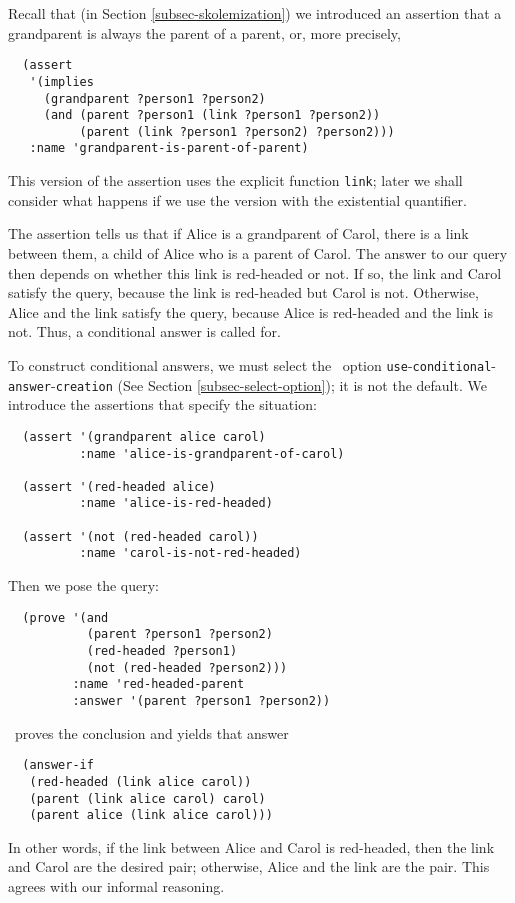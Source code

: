 Recall that (in Section \ref{subsec-skolemization}) we introduced
an assertion that a grandparent is always the parent of a parent, or,
more precisely,
\begin{verbatim}
  (assert
   '(implies
     (grandparent ?person1 ?person2)
     (and (parent ?person1 (link ?person1 ?person2))
          (parent (link ?person1 ?person2) ?person2)))
   :name 'grandparent-is-parent-of-parent)
\end{verbatim}
This version of the assertion uses the explicit function {\tt link};
later we shall consider what happens if we use the version with the
existential quantifier.

The assertion tells us that if Alice is a grandparent of Carol, there
is a link between them, a child of Alice who is a parent of Carol.
The answer to our query then depends on whether this link is
red-headed or not.  If so, the link and Carol satisfy the query,
because the link is red-headed but Carol is not. Otherwise, Alice and
the link satisfy the query, because Alice is red-headed and the link
is not.  Thus, a conditional answer is called for.

To construct conditional answers, we must select the \snark\  option
{\tt use}-{\tt conditional}-{\tt answer}-{\tt creation} (See Section
\ref{subsec-select-option}); it is not the
default.   We introduce the assertions that specify the situation:
\begin{verbatim}
  (assert '(grandparent alice carol)
          :name 'alice-is-grandparent-of-carol)

  (assert '(red-headed alice)
          :name 'alice-is-red-headed)

  (assert '(not (red-headed carol))
          :name 'carol-is-not-red-headed)
\end{verbatim}
Then we pose the query:
\begin{verbatim}
  (prove '(and
           (parent ?person1 ?person2)
           (red-headed ?person1)
           (not (red-headed ?person2)))
         :name 'red-headed-parent
         :answer '(parent ?person1 ?person2))
\end{verbatim}
\Snark\  proves the conclusion and yields that answer
\begin{verbatim}
  (answer-if
   (red-headed (link alice carol))
   (parent (link alice carol) carol)
   (parent alice (link alice carol)))
\end{verbatim}
In other words, if the link between Alice and Carol is red-headed,
then the link and Carol are the desired pair; otherwise, Alice and the
link are the pair.  This agrees with our informal reasoning.

